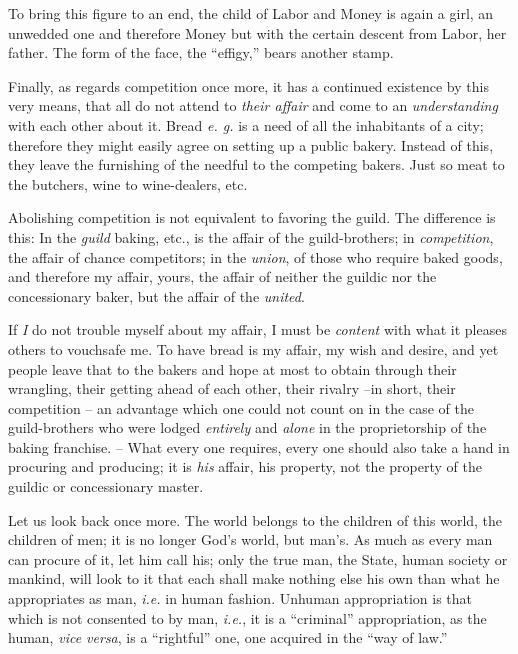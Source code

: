 \documentclass[12pt,a4paper]{book}
\begin{document}
To bring this figure to an end, the child of Labor and Money is again a girl, 
an unwedded one and therefore Money but with the certain descent from Labor, 
her father. The form of the face, the ``effigy,'' bears another stamp.

Finally, as regards competition once more, it has a continued existence by 
this very means, that all do not attend to \textit{their affair} and come to 
an \textit{understanding} with each other about it. Bread \textit{e. g.} is a 
need of all the inhabitants of a city; therefore they might easily agree on 
setting up a public bakery. Instead of this, they leave the furnishing of the 
needful to the competing bakers. Just so meat to the butchers, wine to 
wine-dealers, etc.

Abolishing competition is not equivalent to favoring the guild. The difference 
is this: In the \textit{guild} baking, etc., is the affair of the 
guild-brothers; in \textit{competition}, the affair of chance competitors; in 
the \textit{union}, of those who require baked goods, and therefore my affair, 
yours, the affair of neither the guildic nor the concessionary baker, but the 
affair of the \textit{united}.

If \textit{I} do not trouble myself about my affair, I must be 
\textit{content} with what it pleases others to vouchsafe me. To have bread is 
my affair, my wish and desire, and yet people leave that to the bakers and 
hope at most to obtain through their wrangling, their getting ahead of each 
other, their rivalry --in short, their competition -- an advantage which one 
could not count on in the case of the guild-brothers who were lodged 
\textit{entirely} and \textit{alone} in the proprietorship of the baking 
franchise. -- What every one requires, every one should also take a hand in 
procuring and producing; it is \textit{his} affair, his property, not the 
property of the guildic or concessionary master.

Let us look back once more. The world belongs to the children of this world, 
the children of men; it is no longer God's world, but man's. As much as every 
man can procure of it, let him call his; only the true man, the State, human 
society or mankind, will look to it that each shall make nothing else his own 
than what he appropriates as man, \textit{i.e.} in human fashion. Unhuman 
appropriation is that which is not consented to by man, \textit{i.e.}, it is a 
``criminal'' appropriation, as the human, \textit{vice versa}, is a 
``rightful'' one, one acquired in the ``way of law.''
\end{document}
